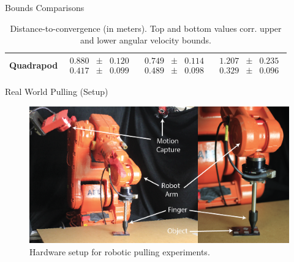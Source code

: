 \documentclass[10pt]{beamer}
\begin{document}
\begin{frame}{Bounds Comparisons}
\begin{table}[t]
\begin{center}
\begin{tabular}[c]{cccc}
        \midrule
        Quadrapod & $\begin{matrix}0.880\\0.417\end{matrix} \begin{matrix}\pm\\\pm\end{matrix} \begin{matrix}0.120\\ 0.099\end{matrix}$ & $\begin{matrix}\mathbf{0.749}\\\mathbf{0.489}\end{matrix} \begin{matrix}\pm\\\pm\end{matrix} \begin{matrix}0.114\\ 0.098\end{matrix}$ & $\begin{matrix}1.207\\0.329\end{matrix} \begin{matrix}\pm\\\pm\end{matrix} \begin{matrix}0.235\\0.096\end{matrix}$ \\
        \bottomrule
      \end{tabular}
  \end{center}
  \caption{Distance-to-convergence (in meters). Top and bottom values corr. upper and lower angular velocity bounds.}
  \label{table:convergence-distance}
\end{table}
\end{frame}

\begin{frame}{Real World Pulling (Setup)}
  \begin{figure}
    \centering
    \includegraphics[width=\columnwidth]{fig/hardware.png}
    \caption{Hardware setup for robotic pulling experiments.}
    \label{fig:hardware}
  \end{figure}
\end{frame}
\end{document}

